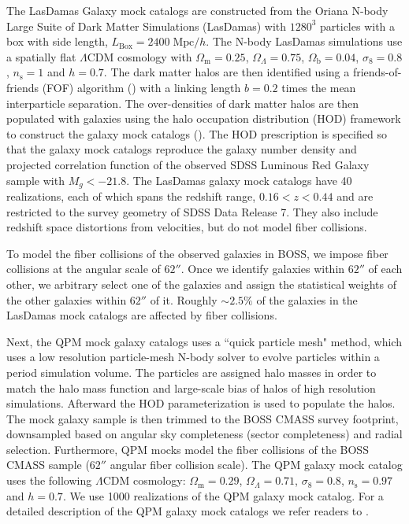 \documentclass{emulateapj}
\begin{document}
The LasDamas Galaxy mock catalogs are constructed from the Oriana N-body Large Suite of Dark Matter Simulations (LasDamas) with $1280^3$ particles with a box with side length, $L_\mathrm{Box} = 2400\;\mathrm{Mpc}/h$. The N-body LasDamas simulations use a spatially flat $\Lambda$CDM cosmology with $\Omega_\mathrm{m} = 0.25$, $\Omega_\Lambda = 0.75$, $\Omega_\mathrm{b} = 0.04$, $\sigma_8 = 0.8$, $n_\mathrm{s} = 1$ and $h=0.7$. The dark matter halos are then identified using a friends-of-friends (FOF) algorithm (\citealt{Davis:1985aa}) with a linking length $b = 0.2 $ times the mean interparticle separation. The over-densities of dark matter halos are then populated with galaxies using the halo occupation distribution (HOD) framework to construct the galaxy mock catalogs (\citealt{McBride:2009aa, McBride:2011aa}). The HOD prescription is specified so that the galaxy mock catalogs reproduce the galaxy number density and projected correlation function of the observed SDSS Luminous Red Galaxy sample with $M_g < -21.8$. The LasDamas galaxy mock catalogs have 40 realizations, each of which spans the redshift range, $0.16 < z < 0.44$ and are restricted to the survey geometry of SDSS Data Release 7. They also include redshift space distortions from velocities, but do not model fiber collisions. 

To model the fiber collisions of the observed galaxies in BOSS, we impose fiber collisions at the angular scale of $62''$. Once we identify galaxies within $62''$ of each other, we arbitrary select one of the galaxies and assign the statistical weights of the other galaxies within $62''$ of it. Roughly $\sim 2.5 \%$ of the galaxies in the LasDamas mock catalogs are affected by fiber collisions. 

Next, the QPM mock galaxy catalogs uses a ``quick particle mesh" method, which uses a low resolution particle-mesh N-body solver to evolve particles within a period simulation volume. The particles are assigned halo masses  in order to match the halo mass function and large-scale bias of halos of high resolution simulations. Afterward the \cite{Tinker:2012aa} HOD parameterization is used to populate the halos. The mock galaxy sample is then trimmed to the BOSS CMASS survey footprint, downsampled based on angular sky completeness (sector completeness) and radial selection. Furthermore, QPM mocks model the fiber collisions of the BOSS CMASS sample ($62''$ angular fiber collision scale). The QPM galaxy mock catalog uses the following $\Lambda$CDM cosmology: $\Omega_\mathrm{m} = 0.29$, $\Omega_\Lambda = 0.71$, $\sigma_8 = 0.8$, $n_\mathrm{s} = 0.97$ and $h=0.7$. We use 1000 realizations of the QPM galaxy mock catalog. For a detailed description of the QPM galaxy mock catalogs we refer readers to \cite{White:2014aa}. 
\end{document}
